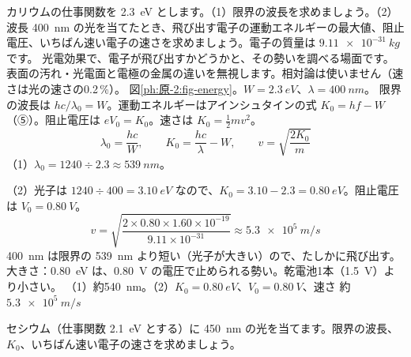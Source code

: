 \label{ph:原-2:ex4}
\begin{phreidai}[カリウムに紫の光を当てる]
カリウムの仕事関数を \qty{2.3}{eV} とします。（1）限界の波長を求めましょう。（2）波長 \qty{400}{nm} の光を当てたとき、飛び出す電子の運動エネルギーの最大値、阻止電圧、いちばん速い電子の速さを求めましょう。電子の質量は $\qty{9.11e-31}{kg}$ です。
\phbamen
光電効果で、電子が飛び出すかどうかと、その勢いを調べる場面です。
\phmushi
表面の汚れ・光電面と電極の金属の違いを無視します。相対論は使いません（速さは光の速さの0.2\,\%）。
\phzu
図\ref{ph:原-2:fig-energy}。$W=\qty{2.3}{eV}$、$\lambda=\qty{400}{nm}$。
\phriyu
限界の波長は $hc/\lambda_0=W$。運動エネルギーはアインシュタインの式 $K_0=hf-W$（⑤）。阻止電圧は $eV_0=K_0$。速さは $K_0=\tfrac12mv^2$。
\phtateru
\[ \lambda_0=\frac{hc}{W},\qquad K_0=\frac{hc}{\lambda}-W,\qquad v=\sqrt{\frac{2K_0}{m}} \]
\phtoku
（1）$\lambda_0=1240\div2.3\approx\qty{539}{nm}$。\par
（2）光子は $1240\div400=\qty{3.10}{eV}$ なので、$K_0=3.10-2.3=\qty{0.80}{eV}$。阻止電圧は $V_0=\qty{0.80}{V}$。
\[ v=\sqrt{\frac{2\times0.80\times1.60\times10^{-19}}{9.11\times10^{-31}}}\approx\qty{5.3e5}{m/s} \]
\phtashikame
\qty{400}{nm} は限界の \qty{539}{nm} より短い（光子が大きい）ので、たしかに飛び出す。\\
大きさ：\qty{0.80}{eV} は、\qty{0.80}{V} の電圧で止められる勢い。乾電池1本（\qty{1.5}{V}）より小さい。
\kotae （1）約\qty{540}{nm}。（2）$K_0=\qty{0.80}{eV}$、$V_0=\qty{0.80}{V}$、速さ 約 $\qty{5.3e5}{m/s}$
\end{phreidai}
\begin{jibun}
セシウム（仕事関数 \qty{2.1}{eV} とする）に \qty{450}{nm} の光を当てます。限界の波長、$K_0$、いちばん速い電子の速さを求めましょう。
\end{jibun}

